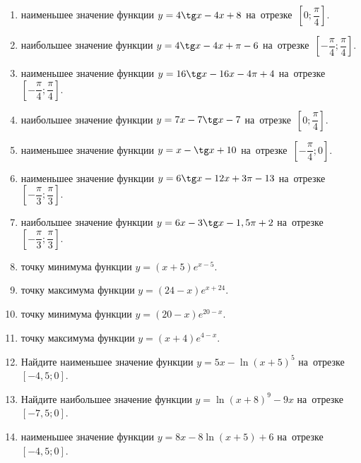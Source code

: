\documentclass[a4paper,10pt]{article}
\begin{document}
\begin{enumerate}
\item {} наименьшее значение функции $y=4\tg x-4x+8$ на~отрезке~$\left[0;\dfrac{\pi }{4}\right]$.

\item {} наибольшее значение функции $y=4\tg x-4x+\pi -6$ на~отрезке~$\left[-\dfrac{\pi }{4};\dfrac{\pi }{4}\right]$.

\item {} наименьшее значение функции $y=16\tg x-16x-4\pi +4$ на~отрезке~$\left[-\dfrac{\pi }{4};\dfrac{\pi }{4}\right]$.

\item {} наибольшее значение функции $y=7x-7\tg x-7$ на~отрезке~$\left[0;\dfrac{\pi }{4}\right]$.

\item {} наименьшее значение функции $y=x-\tg x+10$ на~отрезке~$\left[-\dfrac{\pi }{4};0\right]$.

\item {} наименьшее значение функции $y=6\tg x-12x+3\pi -13$ на~отрезке~$\left[-\dfrac{\pi }{3};\dfrac{\pi }{3}\right]$.

\item {} наибольшее значение функции $y=6x-3\tg x-1,5\pi +2$ на~отрезке~$\left[-\dfrac{\pi }{3};\dfrac{\pi }{3}\right]$.

\item {} точку минимума функции $y=\left(x+5\right)e^{x-5}$.

\item {} точку максимума функции $y=\left(24-x\right)e^{x+24}$.

\item {} точку минимума функции $y=\left(20-x\right)e^{20-x}$.

\item {} точку максимума функции $y=\left(x+4\right)e^{4-x}$.

\item Найдите наименьшее значение функции $y=5x-\ln \left(x+5\right)^5$ на~отрезке~$\left[-4,5;0\right]$.

\item Найдите наибольшее значение функции $y=\ln \left(x+8\right)^9-9x$ на~отрезке~$\left[-7,5;0\right]$.

\item {} наименьшее значение функции $y=8x-8\ln \left(x+5\right)+6$ на~отрезке~$\left[-4,5;0\right]$.


\end{enumerate}
\end{document}
